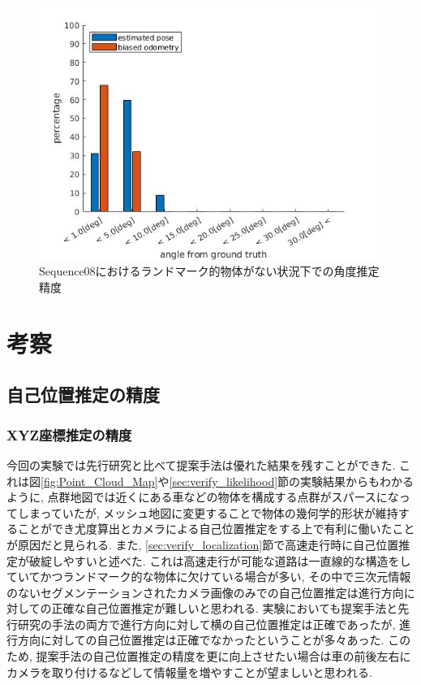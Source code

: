 \begin{figure}[htbp]
 \begin{minipage}{1.0\hsize}
  \begin{center}
   \includegraphics[width=110mm]{./picture/no_car_s8_rpy.jpg}
  \end{center}
  \caption{Sequence08におけるランドマーク的物体がない状況下での角度推定精度}
  \label{fig:no_car_s8_rpy}
 \end{minipage}
\end{figure}

\newpage
\section{考察}\label{sec:considerarion}

\subsection{自己位置推定の精度}

\subsubsection{XYZ座標推定の精度}
今回の実験では先行研究と比べて提案手法は優れた結果を残すことができた. これは図\ref{fig:Point_Cloud_Map}や\ref{sec:verify_likelihood}節の実験結果からもわかるように, 点群地図では近くにある車などの物体を構成する点群がスパースになってしまっていたが, メッシュ地図に変更することで物体の幾何学的形状が維持することができ尤度算出とカメラによる自己位置推定をする上で有利に働いたことが原因だと見られる. また, \ref{sec:verify_localization}節で高速走行時に自己位置推定が破綻しやすいと述べた. これは高速走行が可能な道路は一直線的な構造をしていてかつランドマーク的な物体に欠けている場合が多い, その中で三次元情報のないセグメンテーションされたカメラ画像のみでの自己位置推定は進行方向に対しての正確な自己位置推定が難しいと思われる. 実験においても提案手法と先行研究の手法の両方で進行方向に対して横の自己位置推定は正確であったが, 進行方向に対しての自己位置推定は正確でなかったということが多々あった. このため, 提案手法の自己位置推定の精度を更に向上させたい場合は車の前後左右にカメラを取り付けるなどして情報量を増やすことが望ましいと思われる.

